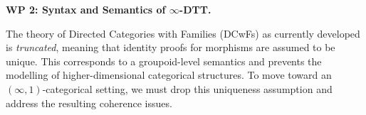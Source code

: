 \documentclass[a4paper,11pt]{article}
\renewcommand{\paragraph}[1]{\textbf{#1.}}
\begin{document}





\paragraph{WP 2: Syntax and Semantics of $\infty$-DTT}

The theory of Directed Categories with Families (DCwFs) as currently
developed is \emph{truncated}, meaning that identity proofs for
morphisms are assumed to be unique. This corresponds to a
groupoid-level semantics and prevents the modelling of
higher-dimensional categorical structures. To move toward an
$(\infty,1)$-categorical setting, we must drop this uniqueness assumption
and address the resulting coherence issues. 
\end{document}
